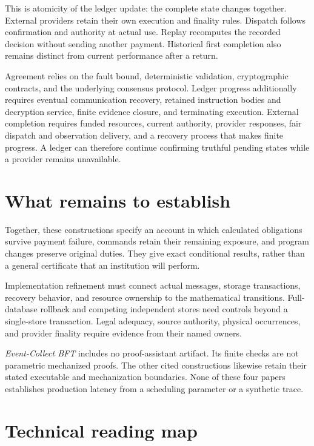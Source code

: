 \documentclass{momentum}
\begin{document}
This is atomicity of the ledger update: the complete state changes together. External providers retain their own execution and finality rules. Dispatch follows confirmation and authority at actual use. Replay recomputes the recorded decision without sending another payment. Historical first completion also remains distinct from current performance after a return.

Agreement relies on the fault bound, deterministic validation, cryptographic contracts, and the underlying consensus protocol. Ledger progress additionally requires eventual communication recovery, retained instruction bodies and decryption service, finite evidence closure, and terminating execution. External completion requires funded resources, current authority, provider responses, fair dispatch and observation delivery, and a recovery process that makes finite progress. A ledger can therefore continue confirming truthful pending states while a provider remains unavailable.

\section{What remains to establish}
\label{sec:limits}

Together, these constructions specify an account in which calculated obligations survive payment failure, commands retain their remaining exposure, and program changes preserve original duties. They give exact conditional results, rather than a general certificate that an institution will perform.

Implementation refinement must connect actual messages, storage transactions, recovery behavior, and resource ownership to the mathematical transitions. Full-database rollback and competing independent stores need controls beyond a single-store transaction. Legal adequacy, source authority, physical occurrences, and provider finality require evidence from their named owners.

\emph{Event-Collect BFT} includes no proof-assistant artifact. Its finite checks are not parametric mechanized proofs. The other cited constructions likewise retain their stated executable and mechanization boundaries. None of these four papers establishes production latency from a scheduling parameter or a synthetic trace.

\section{Technical reading map}
\label{sec:reading}
\end{document}
